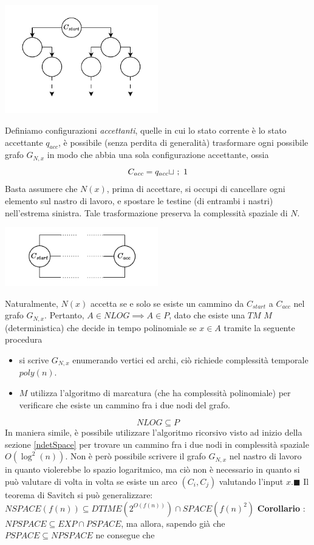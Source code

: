 \documentclass[10pt, letterpaper]{report}
\begin{document}
\begin{center}
    \includegraphics[width=0.5\textwidth ]{images/grafoGNx.drawio.pdf}
\end{center}
Definiamo configurazioni \textit{accettanti}, quelle in cui lo stato corrente è lo stato accettante $q_{acc}$, è possibile (senza perdita di generalità) trasformare ogni possibile grafo $G_{N,x}$ in modo che abbia una sola configurazione accettante, ossia 
$$ C_{acc}=q_{acc}{\sqcup}\  ; \ 1$$
Basta assumere che $N(x)$, prima di accettare, si occupi di cancellare ogni elemento sul nastro di lavoro, e spostare le testine (di entrambi i nastri) nell'estrema sinistra. Tale trasformazione preserva la complessità spaziale di $N$.
\begin{center}
    \includegraphics[width=0.5\textwidth ]{images/Cstart.drawio.pdf}
\end{center}
Naturalmente, $N(x)$ accetta se e solo se esiste un cammino da $C_{start}$ a $C_{acc}$ nel grafo $G_{N,x}$. Pertanto, $A\in NLOG \implies A\in P$, dato che esiste una $TM$ $M$ (deterministica) che decide in tempo polinomiale se $x\in A$ tramite la seguente procedura\begin{itemize}
    \item si scrive $G_{N,x}$ enumerando vertici ed archi, ciò richiede complessità temporale $poly(n)$.
    \item $M$ utilizza l'algoritmo di marcatura (che ha complessità polinomiale) per verificare che esiste un cammino fra i due nodi del grafo.
\end{itemize}
$$ NLOG\subseteq P$$
In maniera simile, è possibile utilizzare l'algoritmo ricorsivo visto ad inizio della sezione \ref{ndetSpace} per trovare un cammino fra i due nodi in complessità spaziale $O(\log^2(n))$.\acc 
Non è però possibile scrivere il grafo $G_{N,x}$ nel nastro di lavoro in quanto violerebbe lo spazio logaritmico, ma ciò non è necessario in quanto si può valutare di volta in volta se esiste un arco $(C_i,C_j)$ valutando l'input $x$.\hfill$\blacksquare$\acc  
Il teorema di Savitch si può generalizzare:\acc 
\teo{} $NSPACE(f(n))\subseteq DTIME(2^{O(f(n))})\cap SPACE(f(n)^2)$\acc 
\textbf{Corollario} : $NPSPACE\subseteq EXP\cap PSPACE$, ma allora, sapendo già che $PSPACE\subseteq NPSPACE$ ne consegue che
\flowerLine 
\end{document}
